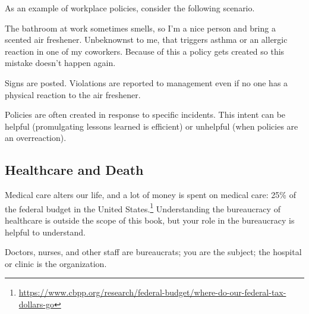 As an example of workplace policies, consider the following scenario. 
\begin{mdframed}[frametitle={The Bathroom Stinks},frametitlerule=true,frametitlealignment=\centering]
The bathroom at work sometimes smells, so I'm a nice person and bring a scented air freshener. Unbeknownst to me, that triggers asthma or an allergic reaction in one of my coworkers. Because of this a policy gets created so this mistake doesn't happen again. 

Signs are posted. Violations are reported to management even if no one has a physical reaction to the air freshener.
\end{mdframed}

Policies are often created in response to specific incidents. This intent can be helpful (promulgating lessons learned is efficient) or unhelpful (when policies are an overreaction). 

\subsection*{Healthcare and Death\label{sec:bureaucracy-of-death}}
Medical care alters our life, and a lot of money is spent on medical care: 25\% of the federal budget in the United States.\footnote{\href{https://www.cbpp.org/research/federal-budget/where-do-our-federal-tax-dollars-go}{https://www.cbpp.org/research/federal-budget/where-do-our-federal-tax-dollars-go}} Understanding the bureaucracy of healthcare is outside the scope of this book, but your role in the bureaucracy is helpful to understand.

Doctors, nurses, and other staff are bureaucrats; you are the subject; the hospital or clinic is the organization. 

